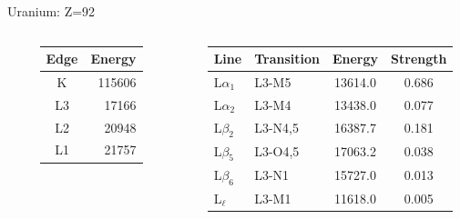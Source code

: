 \documentclass[10pt, xcolor=x11names, compress, handout]{beamer}
\begin{document}
\begin{frame}
  \begin{block}{Uranium: Z=92}
    \footnotesize
    \begin{columns}[T]
      \begin{column}{0.05\linewidth}
      \end{column}
      \begin{column}{0.2\linewidth}
        \begin{tabular}{cr}
          Edge &  Energy \\
          \hline
          K    & 115606  \\
          \alert{L3}   & \alert{17166}   \\
          L2   & 20948   \\
          L1   & 21757
        \end{tabular}
      \end{column}
      \begin{column}{0.05\linewidth}
      \end{column}
      \begin{column}{0.7\linewidth}
        \begin{tabular}{llcc}
          Line & Transition & Energy &  Strength \\
          \hline
          L$\alpha_1$ & \alert{L3}-M5   & 13614.0 & 0.686\\
          L$\alpha_2$ & \alert{L3}-M4   & 13438.0 & 0.077\\
          L$\beta_2$  & \alert{L3}-N4,5 & 16387.7 & 0.181\\
          L$\beta_5$  & \alert{L3}-O4,5 & 17063.2 & 0.038\\
          L$\beta_6$  & \alert{L3}-N1   & 15727.0 & 0.013\\
          L$_\ell$    & \alert{L3}-M1   & 11618.0 & 0.005\\
        \end{tabular}
      \end{column}
    \end{columns}
  \end{block}
\end{frame}
\end{document}
